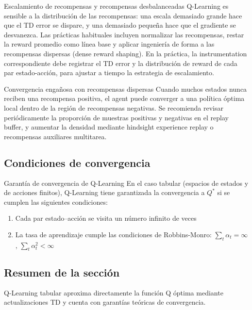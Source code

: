\documentclass[a4paper]{article}
\begin{document}
\begin{importantbox}{Escalamiento de recompensas y recompensas desbalanceadas}
Q-Learning es sensible a la distribución de las recompensas: una escala demasiado grande hace que el TD error se dispare, y una demasiado pequeña hace que el gradiente se desvanezca. Las prácticas habituales incluyen normalizar las recompensas, restar la reward promedio como línea base y aplicar ingeniería de forma a las recompensas dispersas (dense reward shaping). En la práctica, la instrumentation correspondiente debe registrar el TD error y la distribución de reward de cada par estado-acción, para ajustar a tiempo la estrategia de escalamiento.
\end{importantbox}

\begin{warningbox}{Convergencia engañosa con recompensas dispersas}
Cuando muchos estados nunca reciben una recompensa positiva, el agent puede converger a una política óptima local dentro de la región de recompensas negativas. Se recomienda revisar periódicamente la proporción de muestras positivas y negativas en el replay buffer, y aumentar la densidad mediante hindsight experience replay o recompensas auxiliares multitarea.
\end{warningbox}

\subsection{Condiciones de convergencia}

\begin{importantbox}{Garantía de convergencia de Q-Learning}
En el caso tabular (espacios de estados y de acciones finitos), Q-Learning tiene garantizada la convergencia a $Q^*$ si se cumplen las siguientes condiciones:
\begin{enumerate}
    \item Cada par estado--acción se visita un número infinito de veces
    \item La tasa de aprendizaje cumple las condiciones de Robbins-Monro: $\sum_t \alpha_t = \infty$, $\sum_t \alpha_t^2 < \infty$
\end{enumerate}
\end{importantbox}

\subsection{Resumen de la sección}

Q-Learning tabular aproxima directamente la función Q óptima mediante actualizaciones TD y cuenta con garantías teóricas de convergencia.
\end{document}
